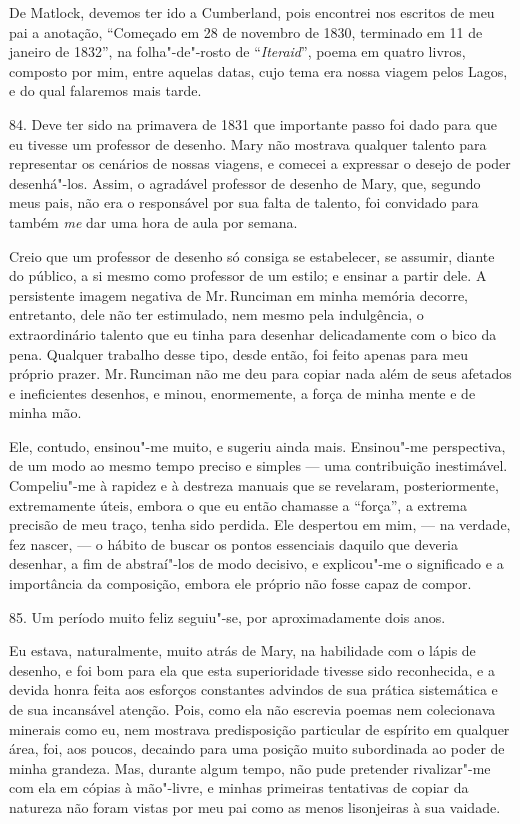 De Matlock, devemos ter ido a Cumberland, pois encontrei nos escritos de
meu pai a anotação, ``Começado em 28 de novembro de 1830, terminado em
11 de janeiro de 1832'', na folha"-de"-rosto de ``\emph{Iteraid}'', poema
em quatro livros, composto por mim, entre aquelas datas, cujo tema era
nossa viagem pelos Lagos, e do qual falaremos mais tarde.

84. Deve ter sido na primavera de 1831 que importante passo foi dado
para que eu tivesse um professor de desenho. Mary não mostrava qualquer
talento para representar os cenários de nossas viagens, e comecei a
expressar o desejo de poder desenhá"-los. Assim, o agradável professor de
desenho de Mary, que, segundo meus pais, não era o responsável por sua
falta de talento, foi convidado para também \emph{me} dar uma hora de
aula por semana.

Creio que um professor de desenho só consiga se estabelecer, se assumir,
diante do público, a si mesmo como professor de um estilo; e ensinar a
partir dele. A persistente imagem negativa de Mr.\,Runciman em minha
memória decorre, entretanto, dele não ter estimulado, nem mesmo pela
indulgência, o extraordinário talento que eu tinha para desenhar
delicadamente com o bico da pena. Qualquer trabalho desse tipo, desde
então, foi feito apenas para meu próprio prazer. Mr.\,Runciman não me deu
para copiar nada além de seus afetados e ineficientes desenhos, e minou,
enormemente, a força de minha mente e de minha mão.

Ele, contudo, ensinou"-me muito, e sugeriu ainda mais. Ensinou"-me
perspectiva, de um modo ao mesmo tempo preciso e simples --- uma
contribuição inestimável. Compeliu"-me à rapidez e à destreza manuais que
se revelaram, posteriormente, extremamente úteis, embora o que eu então
chamasse a ``força'', a extrema precisão de meu traço, tenha sido
perdida. Ele despertou em mim, --- na verdade, fez nascer, --- o hábito de
buscar os pontos essenciais daquilo que deveria desenhar, a fim de
abstraí"-los de modo decisivo, e explicou"-me o significado e a
importância da composição, embora ele próprio não fosse capaz de compor.

85. Um período muito feliz seguiu"-se, por aproximadamente dois anos.

Eu estava, naturalmente, muito atrás de Mary, na habilidade com o lápis
de desenho, e foi bom para ela que esta superioridade tivesse sido
reconhecida, e a devida honra feita aos esforços constantes advindos de
sua prática sistemática e de sua incansável atenção. Pois, como ela não
escrevia poemas nem colecionava minerais como eu, nem mostrava
predisposição particular de espírito em qualquer área, foi, aos poucos,
decaindo para uma posição muito subordinada ao poder de minha grandeza.
Mas, durante algum tempo, não pude pretender rivalizar"-me com ela em
cópias à mão"-livre, e minhas primeiras tentativas de copiar da natureza
não foram vistas por meu pai como as menos lisonjeiras à sua vaidade.


